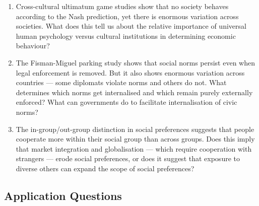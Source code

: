 \documentclass[12pt, letterpaper]{article}
\begin{document}
\begin{enumerate}
\item Cross-cultural ultimatum game studies show that no society behaves according to the Nash prediction, yet there is enormous variation across societies. What does this tell us about the relative importance of universal human psychology versus cultural institutions in determining economic behaviour?

\item The Fisman-Miguel parking study shows that social norms persist even when legal enforcement is removed. But it also shows enormous variation across countries --- some diplomats violate norms and others do not. What determines which norms get internalised and which remain purely externally enforced? What can governments do to facilitate internalisation of civic norms?

\item The in-group/out-group distinction in social preferences suggests that people cooperate more within their social group than across groups. Does this imply that market integration and globalisation --- which require cooperation with strangers --- erode social preferences, or does it suggest that exposure to diverse others can expand the scope of social preferences?
\end{enumerate}


\subsection{Application Questions}
\end{document}

